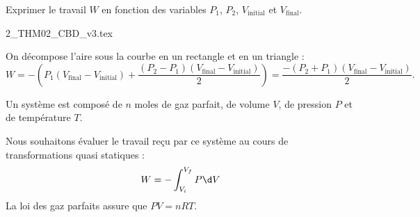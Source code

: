 


\begin{enonce}
Exprimer le travail $W$ en fonction des variables $P_1$, $P_2$, $V_{\text{initial}}$ et $V_{\text{final}}$.
\begin{center}
{2_THM02_CBD_v3.tex}
\end{center}
\end{enonce}


\begin{corrige}
On décompose l'aire sous la courbe en un rectangle et en un triangle : \minusSmallskip
\[
W=  -\left(P_1 (V_{\text{final}}-V_{\text{initial}})+\frac{(P_2-P_1)(V_{\text{final}}-V_{\text{initial}})}{2}\right)
= \frac{-(P_2+P_1)(V_{\text{final}}-V_{\text{initial}})}{2}.
\]
\end{corrige}



\finEntrainement






\hauteurLargeurCadreReponse		{8mm}{5cm}
\initialisationEntrainement

Un système est composé de $n$ moles de gaz parfait, de volume $V$, de pression $P$ et de température $T$.

Nous souhaitons évaluer le travail reçu par ce système au cours de transformations quasi statiques :
$$W=- \int_{V_i}^{V_f}P\d V$$
La loi des gaz parfaits assure que $PV=nRT$.\\
\debutEntrainement

